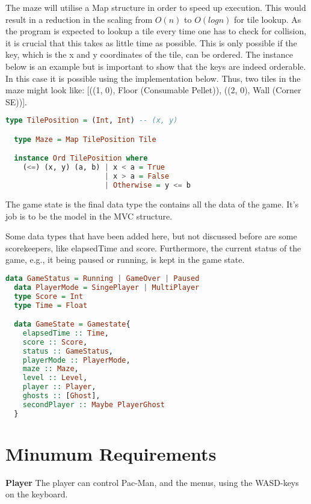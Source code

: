 \documentclass[11pt]{Article}
\begin{document}
The maze will utilise a Map structure in order to speed up execution. This would result in a reduction in the scaling from $O(n)$ to $O(logn)$ for tile lookup. As the program is expected to lookup a tile every time one has to check for collision, it is crucial that this takes as little time as possible. This is only possible if the key, which is the x and y coordinates of the tile, can be ordered. The instance below is an example but is important to show that the keys are indeed orderable. In this case it is possible using the implementation below. Thus, two tiles in the maze might look like: [((1, 0), Floor (Consumable Pellet)), ((2, 0), Wall (Corner SE))]. 

\begin{lstlisting}[language=Haskell]
  type TilePosition = (Int, Int) -- (x, y)

  type Maze = Map TilePosition Tile

  instance Ord TilePosition where 
    (<=) (x, y) (a, b) | x < a = True 
                       | x > a = False
                       | Otherwise = y <= b

\end{lstlisting}

\newpage
The game state is the final data type the contains all the data of the game. It's job is to be the model in the MVC structure. 

Some data types that have been added here, but not discussed before are some scorekeepers, like elapsedTime and score. Furthermore, the current status of the game, e.g., it being paused or running, is kept in the game state.
\begin{lstlisting}[language=Haskell]
  data GameStatus = Running | GameOver | Paused
  data PlayerMode = SingePlayer | MultiPlayer
  type Score = Int
  type Time = Float

  data GameState = Gamestate{
    elapsedTime :: Time,
    score :: Score,
    status :: GameStatus,
    playerMode :: PlayerMode,
    maze :: Maze, 
    level :: Level,
    player :: Player,
    ghosts :: [Ghost],
    secondPlayer :: Maybe PlayerGhost
  }
\end{lstlisting}


\section{Minumum Requirements} \label{ch:minumumRequirements}
\noindent \textbf{Player} The player can control Pac-Man, and the menus, using the WASD-keys on the keyboard.\\
\end{document}
